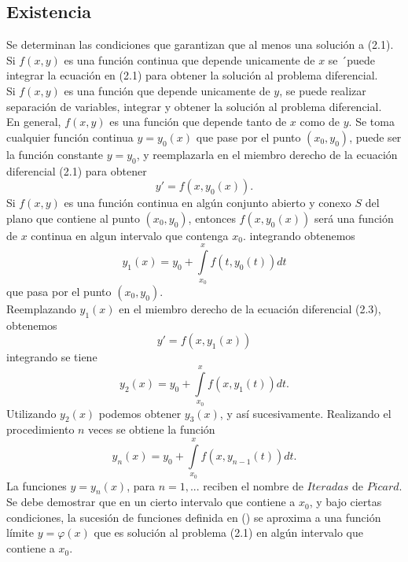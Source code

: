 \documentclass[10pt,a4paper,notitlepage]{report}
\begin{document}
\begin{itemize}
\subsection{Existencia}
Se determinan las condiciones que garantizan que al menos una solución a (2.1). \\
Si $f(x, y)$ es una función continua que depende unicamente de $x$ se ´puede integrar la ecuación en (2.1) para obtener la solución al problema diferencial. \\
Si $f(x, y)$ es una función que depende unicamente de $y$, se puede realizar separación de variables, integrar y obtener la solución al problema diferencial. \\
En general, $f(x, y)$ es una función que depende tanto de $x$ como de $y$. Se toma cualquier función continua $y = y_{0}(x)$ que pase por el punto $(x_{0}, y_{0})$, puede ser la función constante $y = y_{0}$, y reemplazarla en el miembro derecho de la ecuación diferencial (2.1) para obtener
\begin{equation}
y' = f(x, y_{0} (x)).
\end{equation}
Si $f(x, y)$ es una función continua en algún conjunto abierto y conexo $S$ del plano que contiene al punto $(x_{0}, y_{0})$, entonces $f(x, y_{0} (x))$ será una función de $x$ continua en algun intervalo que contenga $x_{0}$. integrando obtenemos
\begin{equation}
y_{1} (x) = y_{0} + \int\limits_{x_{0}}^{x} f(t, y_{0} (t)) dt
\end{equation}
que pasa por el punto $(x_{0}, y_{0}).$ \\
Reemplazando $y_{1} (x)$ en el miembro derecho de la ecuación diferencial (2.3), obtenemos
\begin{equation}
y' = f(x, y_{1} (x))
\end{equation}
integrando se tiene
\begin{equation}
y_{2} (x) = y_{0} + \int\limits_{x_{0}}^{x} f(x, y_{1} (t)) dt.
\end{equation}
Utilizando $y_{2} (x)$ podemos obtener $y_{3} (x)$, y así sucesivamente. Realizando el procedimiento $n$ veces se obtiene la función
\begin{equation}
y_{n} (x) = y_{0} + \int\limits_{x_{0}}^{x} f(x, y_{n - 1} (t)) dt.
\end{equation}
La funciones $y = y_{n} (x)$, para $n = 1, ...$ reciben el nombre de $Iteradas$ de $Picard$. \\
Se debe demostrar que en un cierto intervalo que contiene a $x_{0}$, y bajo ciertas condiciones, la sucesión de funciones definida en () se aproxima a una función límite $y = \varphi (x)$ que es solución al problema (2.1) en algún intervalo que contiene a $x_{0}$.

\end{itemize}
\end{document}
